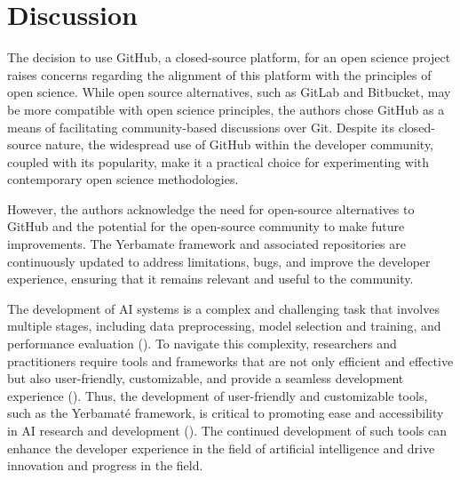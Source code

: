 \section{Discussion}

The decision to use GitHub, a closed-source platform, for an open science project raises concerns regarding the alignment of this platform with the principles of open science. While open source alternatives, such as GitLab and Bitbucket, may be more compatible with open science principles, the authors chose GitHub as a means of facilitating community-based discussions over Git. Despite its closed-source nature, the widespread use of GitHub within the developer community, coupled with its popularity, make it a practical choice for experimenting with contemporary open science methodologies.

However, the authors acknowledge the need for open-source alternatives to GitHub and the potential for the open-source community to make future improvements. The Yerbamate framework and associated repositories are continuously updated to address limitations, bugs, and improve the developer experience, ensuring that it remains relevant and useful to the community.


The development of AI systems is a complex and challenging task that involves multiple stages, including data preprocessing, model selection and training, and performance evaluation (\cite{lecun2015deep}). To navigate this complexity, researchers and practitioners require tools and frameworks that are not only efficient and effective but also user-friendly, customizable, and provide a seamless development experience (\cite{cardoso2022monai,pathml,thingsvision, olson2018system}). Thus, the development of user-friendly and customizable tools, such as the Yerbamaté framework, is critical to promoting ease and accessibility in AI research and development (\cite{olson2018system}). The continued development of such tools can enhance the developer experience in the field of artificial intelligence and drive innovation and progress in the field.


